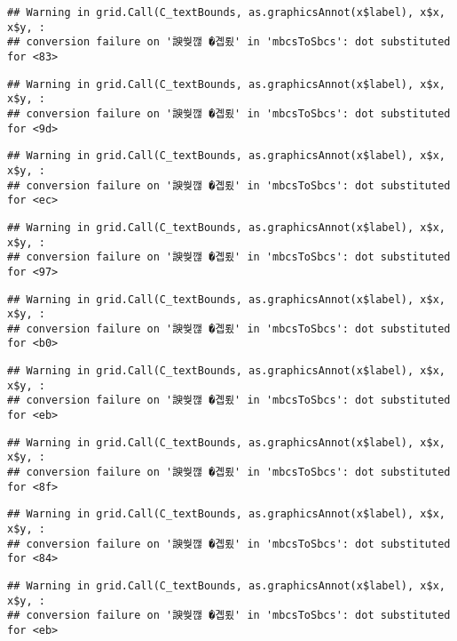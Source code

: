 \documentclass[
]{article}
\begin{document}
\begin{verbatim}
## Warning in grid.Call(C_textBounds, as.graphicsAnnot(x$label), x$x, x$y, :
## conversion failure on '諛쒖깮 �곕룄' in 'mbcsToSbcs': dot substituted for <83>
\end{verbatim}

\begin{verbatim}
## Warning in grid.Call(C_textBounds, as.graphicsAnnot(x$label), x$x, x$y, :
## conversion failure on '諛쒖깮 �곕룄' in 'mbcsToSbcs': dot substituted for <9d>
\end{verbatim}

\begin{verbatim}
## Warning in grid.Call(C_textBounds, as.graphicsAnnot(x$label), x$x, x$y, :
## conversion failure on '諛쒖깮 �곕룄' in 'mbcsToSbcs': dot substituted for <ec>
\end{verbatim}

\begin{verbatim}
## Warning in grid.Call(C_textBounds, as.graphicsAnnot(x$label), x$x, x$y, :
## conversion failure on '諛쒖깮 �곕룄' in 'mbcsToSbcs': dot substituted for <97>
\end{verbatim}

\begin{verbatim}
## Warning in grid.Call(C_textBounds, as.graphicsAnnot(x$label), x$x, x$y, :
## conversion failure on '諛쒖깮 �곕룄' in 'mbcsToSbcs': dot substituted for <b0>
\end{verbatim}

\begin{verbatim}
## Warning in grid.Call(C_textBounds, as.graphicsAnnot(x$label), x$x, x$y, :
## conversion failure on '諛쒖깮 �곕룄' in 'mbcsToSbcs': dot substituted for <eb>
\end{verbatim}

\begin{verbatim}
## Warning in grid.Call(C_textBounds, as.graphicsAnnot(x$label), x$x, x$y, :
## conversion failure on '諛쒖깮 �곕룄' in 'mbcsToSbcs': dot substituted for <8f>
\end{verbatim}

\begin{verbatim}
## Warning in grid.Call(C_textBounds, as.graphicsAnnot(x$label), x$x, x$y, :
## conversion failure on '諛쒖깮 �곕룄' in 'mbcsToSbcs': dot substituted for <84>
\end{verbatim}

\begin{verbatim}
## Warning in grid.Call(C_textBounds, as.graphicsAnnot(x$label), x$x, x$y, :
## conversion failure on '諛쒖깮 �곕룄' in 'mbcsToSbcs': dot substituted for <eb>
\end{verbatim}
\end{document}
